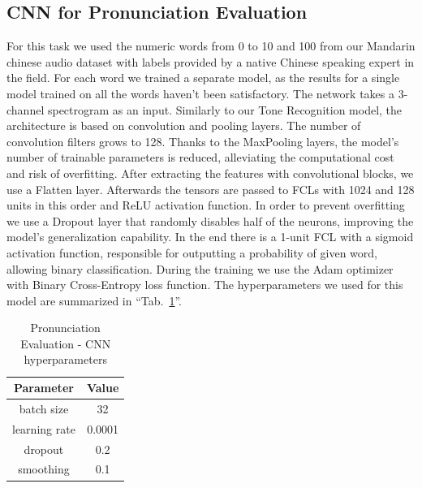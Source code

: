 \documentclass[conference]{IEEEtran}
\begin{document}
\subsection{CNN for Pronunciation Evaluation}
For this task we used the numeric words from 0 to 10 and 100 from our Mandarin chinese audio dataset with labels provided by a native Chinese speaking expert in the field. For each word we trained a separate model, as the results for a single model trained on all the words haven't been satisfactory. The network takes a 3-channel spectrogram as an input. Similarly to our Tone Recognition model, the architecture is based on convolution and pooling layers.
The number of convolution filters grows to 128. Thanks to the MaxPooling layers, the model's number of trainable parameters is reduced, alleviating the computational cost and risk of overfitting. After extracting the features with convolutional blocks, we use a Flatten layer.
Afterwards the tensors are passed to FCLs with 1024 and 128 units in this order and ReLU activation function. In order to prevent overfitting we use a Dropout layer that randomly disables half of the neurons, improving the model's generalization capability.
In the end there is a 1-unit FCL with a sigmoid activation function, responsible for outputting a probability of given word, allowing binary classification. During the training we use the Adam optimizer \cite{Kingma2014AdamAM} with Binary Cross-Entropy loss function.
The hyperparameters we used for this model are summarized in ``Tab.~\ref{tab_CNNPE_hyper}''.

\begin{table}[hbtp]
    \caption{Pronunciation Evaluation - CNN hyperparameters}
    \begin{center}
    \begin{tabular}{|c|c|}
    \hline
    \textbf{Parameter} & {\textbf{Value}} \\
    \hline
    batch size & 32 \\
    \hline
    learning rate & 0.0001 \\
    \hline
    dropout & 0.2 \\
    \hline
    smoothing & 0.1 \\
    \hline
    \end{tabular}
    \label{tab_CNNPE_hyper}
    \end{center}
    \end{table}
\end{document}
